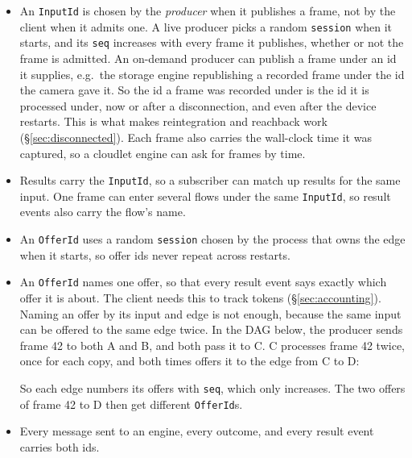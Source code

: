 \documentclass[11pt]{article}
\newcommand{\code}[1]{\texttt{#1}}
\begin{document}
\begin{itemize}[nosep]
  \item An \code{InputId} is chosen by the \emph{producer} when it publishes a
        frame, not by the client when it admits one. A live producer picks a
        random \code{session} when it starts, and its \code{seq} increases with
        every frame it publishes, whether or not the frame is admitted. An
        on-demand producer can publish a frame under an id it supplies, e.g.\
        the storage engine republishing a recorded frame under the id the
        camera gave it. So the id a frame was recorded under is the id it is
        processed under, now or after a disconnection,
        and even after the device restarts. This is what makes reintegration
        and reachback work (\S\ref{sec:disconnected}). Each frame also
        carries the wall-clock time it was captured, so a cloudlet engine can
        ask for frames by time.
  \item Results carry the \code{InputId}, so a subscriber can match up
        results for the same input. One frame can enter several flows under
        the same \code{InputId}, so result events also carry the flow's name.
  \item An \code{OfferId} uses a random \code{session} chosen by the process
        that owns the edge when it starts, so offer ids never repeat across
        restarts.
  \item An \code{OfferId} names one offer, so that every result event says
        exactly which offer it is about. The client needs this to track
        tokens (\S\ref{sec:accounting}). Naming an offer by its input and
        edge is not enough, because the same input can be offered to the same
        edge twice. In the DAG below, the producer sends frame 42 to both A
        and B, and both pass it to C. C processes frame 42 twice, once for
        each copy, and both times offers it to the edge from C to D:
\begin{center}
\end{center}
        So each edge numbers its offers with \code{seq}, which only
        increases. The two offers of frame 42 to D then get different
        \code{OfferId}s.
  \item Every message sent to an engine, every outcome, and every result
        event carries both ids.
\end{itemize}
\end{document}
